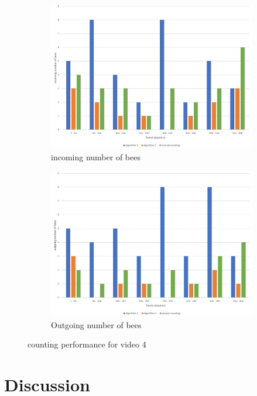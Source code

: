 \documentclass[10pt,twocolumn,letterpaper]{article}
\begin{document}
\begin{figure}[H]
\centering
    \begin{subfigure}[b]{0.35\textwidth}
        \includegraphics[width=\textwidth]{graphs/video4_incoming_number_of_bees}
        \caption{incoming number of bees}
        \label{fig:vdo4i}
    \end{subfigure}
    \begin{subfigure}[b]{0.35\textwidth}
        \includegraphics[width=\textwidth]{graphs/video4_outgoing_number_of_bees}
        \caption{Outgoing number of bees}
        \label{fig:vdo4o}
    \end{subfigure}
\caption{counting performance for video 4}
\label{fig:????}
\end{figure}

\section{Discussion}
\end{document}
